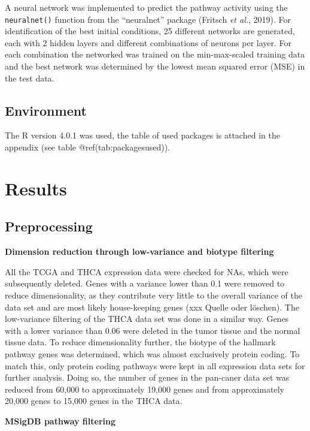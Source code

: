 \documentclass[
  parskip,
  oneside]{scrreprt}
\begin{document}
A neural network was implemented to predict the pathway activity using
the \texttt{neuralnet()} function from the ``neuralnet'' package
(Fritsch \emph{et al.}, 2019). For identification of the best initial
conditions, 25 different networks are generated, each with 2 hidden
layers and different combinations of neurons per layer. For each
combination the networked was trained on the min-max-scaled training
data and the best network was determined by the lowest mean squared
error (MSE) in the test data.

\hypertarget{environment}{%
\section{Environment}\label{environment}}

The R version 4.0.1 was used, the table of used packages is attached in
the appendix (see table @ref(tab:packagesused)).

\hypertarget{results}{%
\chapter{Results}\label{results}}

\hypertarget{preprocessing}{%
\section{Preprocessing}\label{preprocessing}}

\textbf{Dimension reduction through low-variance and biotype filtering}

All the TCGA and THCA expression data were checked for NAs, which were
subsequently deleted. Genes with a variance lower than 0.1 were removed
to reduce dimensionality, as they contribute very little to the overall
variance of the data set and are most likely house-keeping genes (xxx
Quelle oder löschen). The low-variance filtering of the THCA data set
was done in a similar way. Genes with a lower variance than 0.06 were
deleted in the tumor tissue and the normal tissue data. To reduce
dimensionality further, the biotype of the hallmark pathway genes was
determined, which was almost exclusively protein coding. To match this,
only protein coding pathways were kept in all expression data sets for
further analysis. Doing so, the number of genes in the pan-caner data
set was reduced from 60,000 to approximately 19,000 genes and from
approximately 20,000 genes to 15,000 genes in the THCA data.

\textbf{MSigDB pathway filtering}
\end{document}
